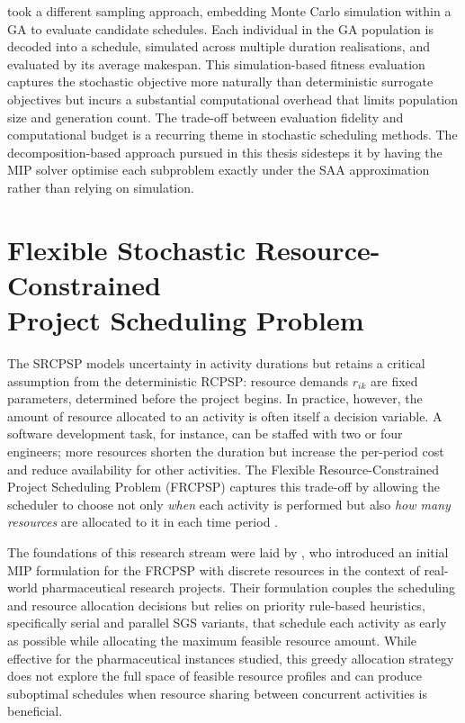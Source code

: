 \cite{Ballestin2007} took a different sampling approach, embedding Monte Carlo
simulation within a GA to evaluate candidate schedules. Each individual in the GA
population is decoded into a schedule, simulated across multiple duration realisations,
and evaluated by its average makespan. This simulation-based fitness evaluation captures
the stochastic objective more naturally than deterministic surrogate objectives but
incurs a substantial computational overhead that limits population size and generation
count. The trade-off between evaluation fidelity and computational budget is a recurring
theme in stochastic scheduling methods. The decomposition-based
approach pursued in this thesis sidesteps it by having the MIP solver optimise each subproblem exactly
under the SAA approximation rather than relying on simulation.

\section{Flexible Stochastic Resource-Constrained \\ Project Scheduling Problem}
\label{sec:frcpsp}
The SRCPSP models uncertainty in activity durations but retains a critical assumption
from the deterministic RCPSP: resource demands $r_{ik}$ are fixed parameters,
determined before the project begins. In practice, however, the amount of resource
allocated to an activity is often itself a decision variable. A software development
task, for instance, can be staffed with two or four engineers; more resources shorten
the duration but increase the per-period cost and reduce availability for other
activities. The Flexible Resource-Constrained Project Scheduling Problem (FRCPSP)
captures this trade-off by allowing the scheduler to choose not only \textit{when}
each activity is performed but also \textit{how many resources} are allocated to it in
each time period \parencite{Naber2014}.

The foundations of this research stream were laid by \cite{Kolisch2003}, who introduced
an initial MIP formulation for the FRCPSP with discrete resources in the context of
real-world pharmaceutical research projects. Their formulation couples the scheduling
and resource allocation decisions but relies on priority rule-based heuristics,
specifically serial and parallel SGS variants, that schedule each activity as early as
possible while allocating the maximum feasible resource amount. While effective for the
pharmaceutical instances studied, this greedy allocation strategy does not explore the
full space of feasible resource profiles and can produce suboptimal schedules when
resource sharing between concurrent activities is beneficial.

